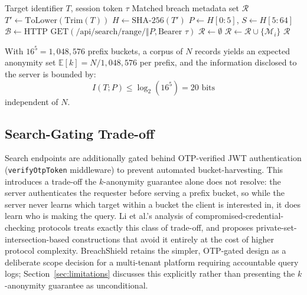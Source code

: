 \documentclass[conference]{IEEEtran}
\begin{document}
\begin{algorithm}[htbp]
\caption{Client-Side $k$-Anonymity Range Query}
\label{alg:kanon}
\begin{algorithmic}[1]
\REQUIRE Target identifier $T$, session token $\tau$
\ENSURE Matched breach metadata set $\mathcal{R}$
\STATE $T' \leftarrow \text{ToLower}(\text{Trim}(T))$
\STATE $H \leftarrow \text{SHA-256}(T')$ 
\STATE $P \leftarrow H[0:5]$, $S \leftarrow H[5:64]$
\STATE $\mathcal{B} \leftarrow \text{HTTP GET}(\text{/api/search/range/} \mathbin{\Vert} P, \text{Bearer } \tau)$
\STATE $\mathcal{R} \leftarrow \emptyset$
        \STATE $\mathcal{R} \leftarrow \mathcal{R} \cup \{\mathcal{M}_i\}$
    \ENDIF
\ENDFOR
\RETURN $\mathcal{R}$
\end{algorithmic}
\end{algorithm}

With $16^5 = 1,048,576$ prefix buckets, a corpus of $N$ records yields an expected anonymity set $\mathbb{E}[k] = N / 1,048,576$ per prefix, and the information disclosed to the server is bounded by:
\begin{equation}
I(T; P) \le \log_2(16^5) = 20\text{ bits}
\end{equation}
independent of $N$.

\subsection{Search-Gating Trade-off}
Search endpoints are additionally gated behind OTP-verified JWT authentication (\texttt{verifyOtpToken} middleware) to prevent automated bucket-harvesting. This introduces a trade-off the $k$-anonymity guarantee alone does not resolve: the server authenticates the requester before serving a prefix bucket, so while the server never learns which target within a bucket the client is interested in, it does learn who is making the query. Li et al.'s analysis of compromised-credential-checking protocols \cite{li2019protocols} treats exactly this class of trade-off, and proposes private-set-intersection-based constructions that avoid it entirely at the cost of higher protocol complexity. BreachShield retains the simpler, OTP-gated design as a deliberate scope decision for a multi-tenant platform requiring accountable query logs; Section~\ref{sec:limitations} discusses this explicitly rather than presenting the $k$-anonymity guarantee as unconditional.
\end{document}
